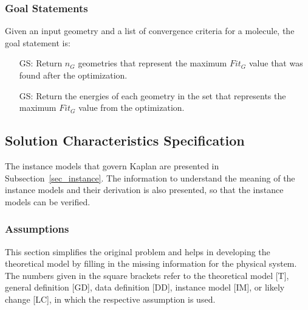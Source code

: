 \documentclass[12pt]{article}
\newcounter{goalnum} %
\newcommand{\progname}{Kaplan} %
\begin{document}
\subsubsection{Goal Statements}

\noindent Given an input geometry and a list of convergence criteria for a 
molecule, the goal statement is:

\begin{itemize}

\item[GS\refstepcounter{goalnum}\thegoalnum \label{goal}:] Return $n_G$ 
geometries that represent the maximum $Fit_G$ value that was found after the 
optimization. 

\item[GS\refstepcounter{goalnum}\thegoalnum \label{goal-energy}:] Return the 
energies of each geometry in the set that represents the maximum $Fit_G$ value 
from the optimization.



\end{itemize}

\subsection{Solution Characteristics Specification}

The instance models that govern \progname{} are presented in
Subsection~\ref{sec_instance}.  The information to understand the meaning of the
instance models and their derivation is also presented, so that the instance
models can be verified.

\subsubsection{Assumptions}

This section simplifies the original problem and helps in developing the
theoretical model by filling in the missing information for the physical
system. The numbers given in the square brackets refer to the theoretical model
[T], general definition [GD], data definition [DD], instance model [IM], or
likely change [LC], in which the respective assumption is used.
\end{document}
